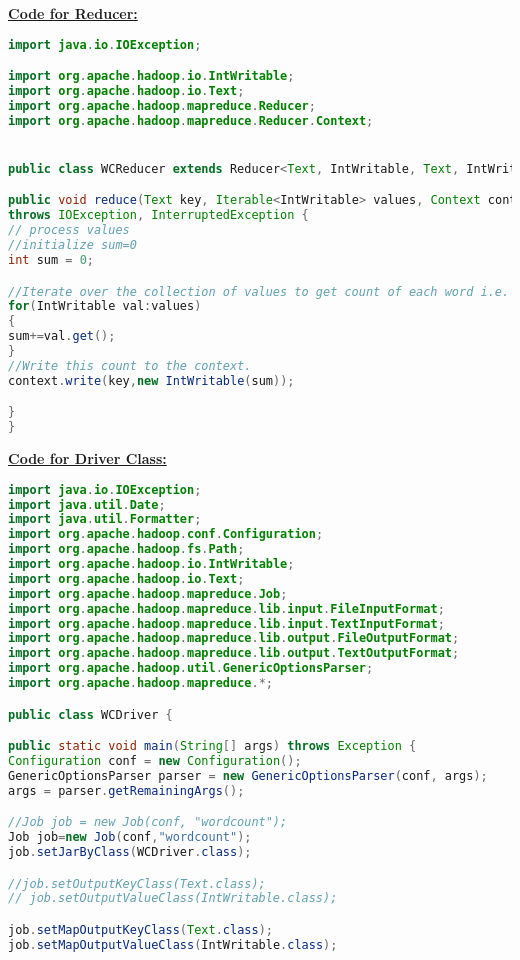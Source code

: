 \documentclass[11pt,article]{memoir}
\begin{document}
\begin{flushleft}
\begin{lstlisting}[language=java]
\end{lstlisting}
\textbf{\underline{Code for Reducer:}}
\begin{lstlisting}[language=java]
import java.io.IOException;

import org.apache.hadoop.io.IntWritable;
import org.apache.hadoop.io.Text;
import org.apache.hadoop.mapreduce.Reducer;
import org.apache.hadoop.mapreduce.Reducer.Context;


public class WCReducer extends Reducer<Text, IntWritable, Text, IntWritable> {

public void reduce(Text key, Iterable<IntWritable> values, Context context)
throws IOException, InterruptedException {
// process values
//initialize sum=0
int sum = 0;

//Iterate over the collection of values to get count of each word i.e. key 
for(IntWritable val:values)
{
sum+=val.get();
}
//Write this count to the context. 
context.write(key,new IntWritable(sum));

}
}


\end{lstlisting}
\textbf{\underline{Code for Driver Class:}}
\begin{lstlisting}[language=java]
import java.io.IOException;
import java.util.Date;
import java.util.Formatter;
import org.apache.hadoop.conf.Configuration;
import org.apache.hadoop.fs.Path;
import org.apache.hadoop.io.IntWritable;
import org.apache.hadoop.io.Text;
import org.apache.hadoop.mapreduce.Job;
import org.apache.hadoop.mapreduce.lib.input.FileInputFormat;
import org.apache.hadoop.mapreduce.lib.input.TextInputFormat;
import org.apache.hadoop.mapreduce.lib.output.FileOutputFormat;
import org.apache.hadoop.mapreduce.lib.output.TextOutputFormat;
import org.apache.hadoop.util.GenericOptionsParser;
import org.apache.hadoop.mapreduce.*;

public class WCDriver {

public static void main(String[] args) throws Exception {
Configuration conf = new Configuration();
GenericOptionsParser parser = new GenericOptionsParser(conf, args);
args = parser.getRemainingArgs();

//Job job = new Job(conf, "wordcount");
Job job=new Job(conf,"wordcount");
job.setJarByClass(WCDriver.class);

//job.setOutputKeyClass(Text.class);
// job.setOutputValueClass(IntWritable.class);

job.setMapOutputKeyClass(Text.class);
job.setMapOutputValueClass(IntWritable.class);


\end{lstlisting}
\end{flushleft}
\end{document}
